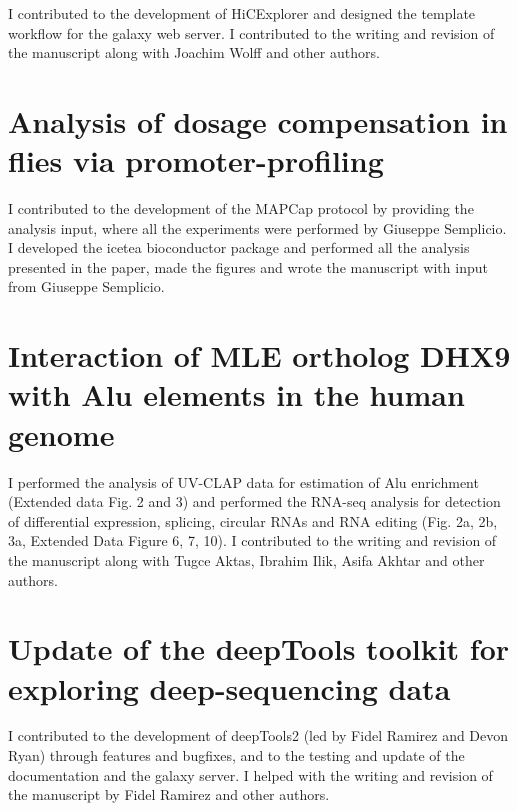 \documentclass[11pt,twoside]{MPIthesis}
\begin{document}
I contributed to the development of HiCExplorer and designed the
template workflow for the galaxy web server. I contributed to the
writing and revision of the manuscript along with Joachim Wolff and
other authors.



\section{Analysis of dosage compensation in flies via
promoter-profiling}\label{analysis-of-dosage-compensation-in-flies-via-promoter-profiling}

I contributed to the development of the MAPCap protocol by providing the
analysis input, where all the experiments were performed by Giuseppe
Semplicio. I developed the icetea bioconductor package and performed all
the analysis presented in the paper, made the figures and wrote the
manuscript with input from Giuseppe Semplicio.



\section{Interaction of MLE ortholog DHX9 with Alu elements in the human
genome}\label{interaction-of-mle-ortholog-dhx9-with-alu-elements-in-the-human-genome}

I performed the analysis of UV-CLAP data for estimation of Alu
enrichment (Extended data Fig. 2 and 3) and performed the RNA-seq
analysis for detection of differential expression, splicing, circular
RNAs and RNA editing (Fig. 2a, 2b, 3a, Extended Data Figure 6, 7, 10). I
contributed to the writing and revision of the manuscript along with
Tugce Aktas, Ibrahim Ilik, Asifa Akhtar and other authors.



\section{Update of the deepTools toolkit for exploring deep-sequencing
data}\label{update-of-the-deeptools-toolkit-for-exploring-deep-sequencing-data}

I contributed to the development of deepTools2 (led by Fidel Ramirez and
Devon Ryan) through features and bugfixes, and to the testing and update
of the documentation and the galaxy server. I helped with the writing
and revision of the manuscript by Fidel Ramirez and other authors.
\end{document}
